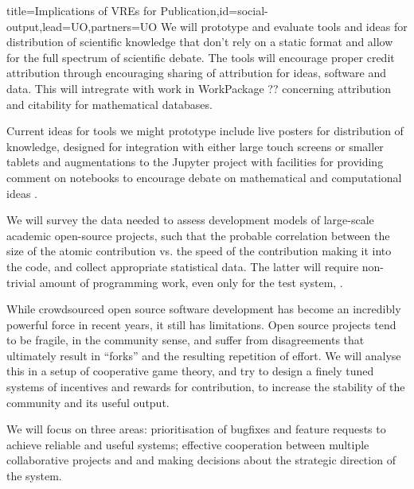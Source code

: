 \begin{workpackage}[id=social-aspects,wphases=0-48,
  title=Social Aspects,
  lead=UO,
  UORM=27,USHRM=8, USORM=6]
\begin{tasklist}
\begin{task}{title=Implications of VREs for Publication,id=social-output,lead=UO,partners={UO}}
We will prototype and evaluate tools and ideas for distribution of
scientific knowledge that don't rely on a static format and allow for
the full spectrum of scientific debate.
The tools will encourage
proper credit attribution through encouraging sharing of attribution
for ideas, software and data. This will intregrate with work in
WorkPackage ?? concerning attribution and citability for mathematical databases.

Current ideas for tools we might prototype include live posters for
distribution of knowledge, designed for integration with either large
touch screens or smaller tablets  and
augmentations to the Jupyter project with facilities for providing comment
on notebooks to encourage debate on mathematical and computational
ideas .
\end{task}


\begin{task}[title=Survey on software development,id=datacollection]
We will survey the data needed to assess development models of
large-scale academic open-source projects, such that the probable
correlation between the size of the atomic contribution vs. the speed
of the contribution making it into the code, and collect appropriate
statistical data. The latter will require non-trivial amount of
programming work, even only for the test system, \Sage.
\end{task}

\begin{task}[title=Mechanism Design for free software development,id=decisionmaking]


While crowdsourced open source software development has become an
incredibly powerful force in recent years, it still has limitations. 
Open source projects tend to be fragile, in the community sense, and
suffer from disagreements that ultimately result in ``forks'' and the
resulting repetition of effort. We will analyse this in a setup of
cooperative game theory, and try to design a finely tuned systems of
incentives and rewards for contribution, to increase the stability of
the community and its useful output.

We will focus on three areas: prioritisation of bugfixes and feature
requests to achieve reliable and useful systems; effective cooperation between multiple collaborative
projects and and making decisions about
the strategic direction of the system.  


\end{task}
\end{tasklist}
\end{workpackage}
